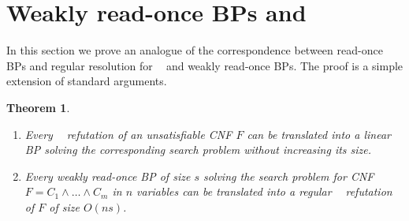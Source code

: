 \documentclass[10pt,a4paper]{article}
\newtheorem{theorem}{Theorem}
\theoremstyle{definition}
\theoremstyle{remark}
\DeclareMathOperator{\reslin}{\mathsf{Res}[\oplus]}
\newcommand{\wreadonce}{weakly read-once}
\newcommand{\Wreadonce}{Weakly read-once}
\begin{document}
\section{\texorpdfstring{\Wreadonce{} BPs and $\reslin$}{\Wreadonce{} BPs and Res[+]}}

In this section we prove an analogue of the correspondence between read-once BPs and regular resolution for $\reslin$ and \wreadonce{} BPs. The proof is a simple extension of standard arguments.


\begin{theorem}\label{thm:res-bp}\leavevmode
  \begin{enumerate}
      \item Every $\reslin$ refutation of an unsatisfiable CNF $F$ can be translated into a linear BP solving the corresponding search problem without increasing its size.

      \item Every \wreadonce{} BP of size $s$ solving the search problem for CNF $F = C_1 \wedge \ldots \wedge C_m$ in $n$ variables can be translated into a regular $\reslin$ refutation of $F$ of size $O(ns)$.
%
  \end{enumerate}
%
\end{theorem}
\end{document}
